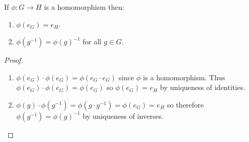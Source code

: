 \documentclass[../main.tex]{subfiles}
\begin{document}
\begin{proposition}
  If $\phi: G \to H$ is a homomorphism then:
  \begin{enumerate}
    \item $\phi(e_G) = e_H$.
    \item $\phi(g^{-1}) = \phi(g)^{-1}$ for all $g \in G$.
  \end{enumerate}
\end{proposition}
\begin{proof}
  \begin{enumerate}
    \item $\phi(e_G) \cdot \phi(e_G) = \phi(e_G \cdot e_G)$ since $\phi$ is a homomorphism.
      Thus $\phi(e_G) \cdot \phi(e_G) = \phi(e_G)$ so $\phi(e_G) = e_H$ by uniqueness of identities.
    \item $\phi(g) \cdot \phi(g^{-1}) = \phi(g \cdot g^{-1}) = \phi(e_G) = e_H$ so therefore $\phi(g^{-1}) = \phi(g)^{-1}$ by uniqueness of inverses.
  \end{enumerate}
\end{proof}
\end{document}
